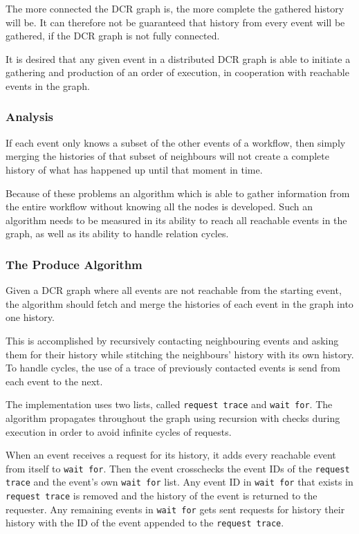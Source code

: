 	The more connected the DCR graph is, the more complete the gathered history will be. It can therefore not be guaranteed that history from every event will be gathered, if the DCR graph is not fully connected.  
	
	It is desired that any given event in a distributed DCR graph is able to initiate a gathering and production of an order of execution, in cooperation with reachable events in the graph. 
	
	\subsubsection{Analysis}
	If each event only knows a subset of the other events of a workflow, then simply merging the histories of that subset of neighbours will not create a complete history of what has happened up until that moment in time. 
	
	Because of these problems an algorithm which is able to gather information from the entire workflow without knowing all the nodes is developed. Such an algorithm needs to be measured in its ability to reach all reachable events in the graph, as well as its ability to handle relation cycles. 
	
	\subsubsection{The Produce Algorithm}
	Given a DCR graph where all events are not reachable from the starting event, the algorithm should fetch and merge the histories of each event in the graph into one history.
	
	This is accomplished by recursively contacting neighbouring events and asking them for their history while stitching the neighbours' history with its own history. To handle cycles, the use of a trace of previously contacted events is send from each event to the next.
	
	\newpar The implementation uses two lists, called \texttt{request trace} and \texttt{wait for}.
	The algorithm propagates throughout the graph using recursion with checks during execution in order to avoid infinite cycles of requests. 
	
	When an event receives a request for its history, it adds every reachable event from itself to \texttt{wait for}. Then the event crosschecks the event IDs of the \texttt{request trace} and the event's own \texttt{wait for} list. Any event ID in \texttt{wait for} that exists in \texttt{request trace} is removed and the history of the event is returned to the requester. Any remaining events in \texttt{wait for} gets sent requests for history their history with the ID of the event appended to the \texttt{request trace}. 
	
